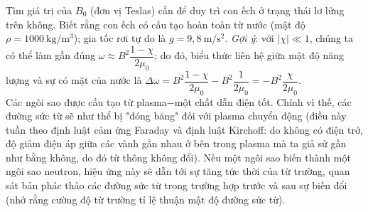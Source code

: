 \begin{vd}[Magnetars]
\begin{enumerate}[1)]
\begin{center}

    \end{center}
    Tìm giá trị của $B_0$ (đơn vị Teslas) cần để duy trì con ếch ở trạng thái lơ lửng trên không. Biết rằng con ếch có cấu tạo hoàn toàn từ nước (mật độ $\rho=1000~\mathrm{kg/m^3}$); gia tốc rơi tự do là $g=9,8~\mathrm{m/s^2}$. \textit{Gợi ý}: với $\left|\chi\right|\ll1$, chúng ta có thể làm gần đúng $\omega\approx B^2\dfrac{1-\chi}{2\mu_0}$; do đó, biểu thức liên hệ giữa mật độ năng lượng và sự có mặt của nước là $\Delta \omega=B^2\dfrac{1-\chi}{2\mu_0}-B^2\dfrac{1}{2\mu_0}=-B^2\dfrac{\chi}{2\mu_0}$.\\
    Các ngôi sao được cấu tạo từ plasma$-$một chất dẫn điện tốt. Chính vì thế, các đường sức từ sẽ như thể bị "đóng băng" đối với plasma chuyển động (điều này tuần theo định luật cảm ứng Faraday và định luật Kirchoff: do không có điện trở, độ giảm điện áp giữa các vành gần nhau ở bên trong plasma mà ta giả sử gần như bằng không, do đó từ thông không đổi). Nếu một ngôi sao biến thành một ngôi sao neutron, hiệu ứng này sẽ dẫn tới sự tăng tức thời của từ trường, quan sát bản phác thảo các đường sức từ trong trường hợp trước và sau sự biến đổi (nhớ rằng cường độ từ trường tỉ lệ thuận mật độ đường sức từ).
    \begin{center}


\end{center}
\end{enumerate}
\end{vd}
